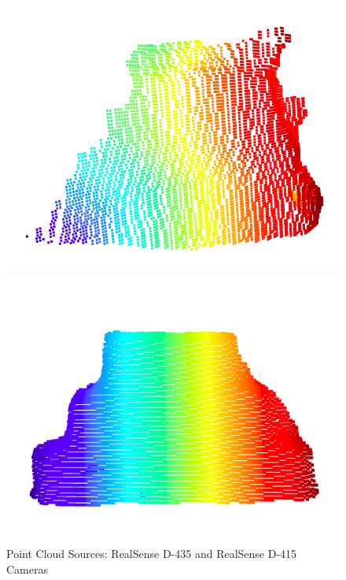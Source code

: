\begin{figure}[htp]
\begin{center}
{
  \includegraphics[clip,width=0.6\columnwidth]{images/real_cloud.png}
}
\end{center}
\begin{center}
{
  \includegraphics[clip,width=0.6\columnwidth]{images/realnew_cloud.png}
}
\end{center}
\caption{Point Cloud Sources: RealSense D-435 and RealSense D-415 Cameras}
\label{setupsystem1}
\end{figure}


